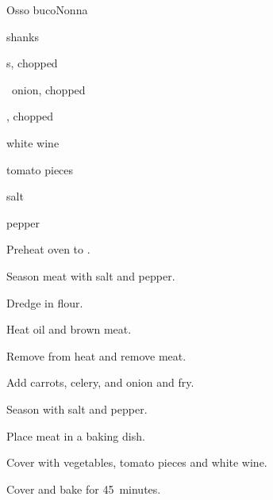 \begin{recipe}{Osso buco}{Nonna}{}

\begin{ingredients}
\item {} shanks
\item {}s, chopped
\item \half~onion, chopped
\item {}, chopped
\item {} white wine
\item tomato pieces
\item salt
\item pepper
\end{ingredients}

\begin{directions}
\item Preheat oven to .
\item Season meat with salt and pepper.
\item Dredge in flour.
\item Heat oil and brown meat.
\item Remove from heat and remove meat.
\item Add carrots, celery, and onion and fry.
\item Season with salt and pepper.
\item Place meat in a baking dish.
\item Cover with vegetables, tomato pieces and white wine.
\item Cover and bake for 45~minutes.
\end{directions}

\end{recipe}
